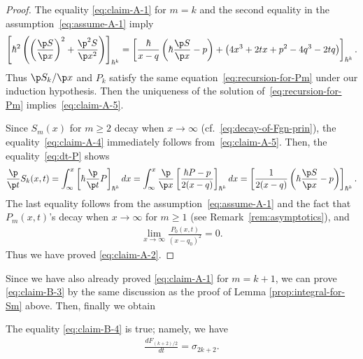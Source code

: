 \begin{proof}
The equality \eqref{eq:claim-A-1} for $m=k$ and
the second equality in the assumption~\eqref{eq:assume-A-1}
imply
\begin{gather*}
\left[
\hbar^{2}\left( \left(\frac{\p S}{\p x}\right)^{2} +
\frac{\p^{2} S}{\p x^{2}} \right)
\right]_{\hbar^{k}}
= \left[ \frac{\hbar}{x-q}\left( \hbar \frac{\p S}{\p x} - p \right)
+ \big(4x^{3}+2t x + p^{2} - 4q^{3}-2tq\big) \right]_{\hbar^{k}}.
\end{gather*}
Thus ${\p S_{k}}/{\p x}$ and $P_{k}$ satisfy the
same equation~\eqref{eq:recursion-for-Pm} under our induction hypothesis.
Then the uniqueness of the solution of~\eqref{eq:recursion-for-Pm}
implies~\eqref{eq:claim-A-5}.

Since $S_{m}(x)$ for $m \ge 2$ decay when
$x \rightarrow \infty$
(cf.~\eqref{eq:decay-of-Fgn-prin}),
the equality~\eqref{eq:claim-A-4}
immediately follows from~\eqref{eq:claim-A-5}.
Then, the equality~\eqref{eq:dt-P} shows
\begin{gather*}
\frac{\p}{\p t} S_{k}(x,t)   =
\int^{x}_{\infty} \left[ \hbar \frac{\p}{\p t} P
\right]_{\hbar^{k}}dx
  =
\int^{x}_{\infty} \frac{\p}{\p x} \left[
\frac{\hbar P - p}{2(x-q)} \right]_{\hbar^{k}} dx
  =
\left[
\frac{1}{2(x-q)} \left( \hbar \frac{\p S}{\p x} - p \right)
\right]_{\hbar^{k}}.
\end{gather*}
The last equality follows from the assumption~\eqref{eq:assume-A-1} and the fact that
$P_{m}(x,t)$'s decay when $x \rightarrow \infty$
for $m \ge 1$ (see Remark~\ref{rem:asymptotics}),
and
\begin{gather*}
\lim_{x\rightarrow\infty} \frac{P_{0}(x,t)}{(x-q_{0})^{2}} = 0.
\end{gather*}
Thus we have proved \eqref{eq:claim-A-2}.
\end{proof}

Since we have also already proved \eqref{eq:claim-A-1}
for $m = k+1$, we can prove \eqref{eq:claim-B-3}
by the same discussion as the proof of
Lemma \ref{prop:integral-for-Sm} above.
Then, f\/inally we obtain

\begin{lem} \label{prop:partial-taufunction-conjecture}
The equality \eqref{eq:claim-B-4} is true; namely, we have
\begin{gather}\label{eq:claim-B-5}
\frac{dF_{(k+2)/2}}{dt} = \sigma_{2k+2}.
\end{gather}
\end{lem}

